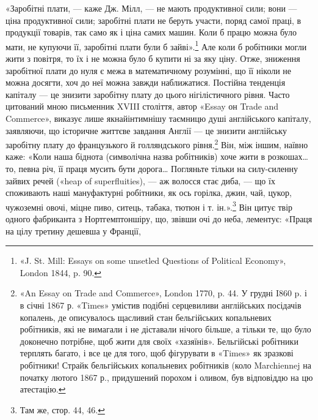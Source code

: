 «Заробітні плати, — каже Дж. Мілл, — не мають продуктивної
сили; вони — ціна продуктивної сили; заробітні плати не
беруть участи, поряд самої праці, в продукції товарів, так само
як і ціна самих машин. Коли б працю можна було мати, не купуючи
її, заробітні плати були б зайві».\footnote{
«J. St. Mill: Essays on some unsetled Questions of Political Economy»,
London 1844, p. 90.
} Але коли б робітники
могли жити з повітря, то їх і не можна було б купити ні за яку ціну.
Отже, зниження заробітної плати до нуля є межа в математичному
розумінні, що її ніколи не можна досягти, хоч до неї можна
завжди наближатися. Постійна тенденція капіталу — це знизити
заробітну плату до цього нігілістичного рівня. Часто цитований
мною письменник XVIII століття, автор «Essay он Trade and
Commerce», виказує лише якнайінтимнішу таємницю душі англійського
капіталу, заявляючи, що історичне життєве завдання
Англії — це знизити англійську заробітну плату до французького
й голляндського рівня.\footnote{
«An Essay on Trade and Commerce», London 1770, p. 44. У грудні
I860 p. і в січні 1867 р. «Times» умістив подібні серцевиливи англійських
посідачів копалень, де описувалось щасливий стан бельгійських
копальневих робітників, які не вимагали і не діставали нічого більше,
а тільки те, що було доконечно потрібне, щоб жити для своїх «хазяїнів».
Бельгійські робітники терплять багато, і все це для того, щоб фігурувати
в «Times» як зразкові робітники! Страйк бельгійських копальневих
робітників (коло Marchiennej на початку лютого 1867 р., придушений
порохом і оливом, був відповіддю на цю атестацію.
} Він, між іншим, наївно каже: «Коли
наша біднота (символічна назва робітників) хоче жити в розкошах\dots{}
то, певна річ, її праця мусить бути дорога\dots{} Погляньте
тільки на силу-силенну зайвих речей («heap of superfluities), —
аж волосся стає диба, — що їх споживають наші мануфактурні
робітники, як ось горілка, джин, чай, цукор, чужоземні
овочі, міцне пиво, ситець, табака, тютюн і т. ін.».\footnote{
Там же, стор. 44, 46.
} Він цитує
твір одного фабриканта з Нортгемптоншіру, що, звівши очі до
неба, лементує: «Праця на цілу третину дешевша у Франції,
\parbreak{}  %
